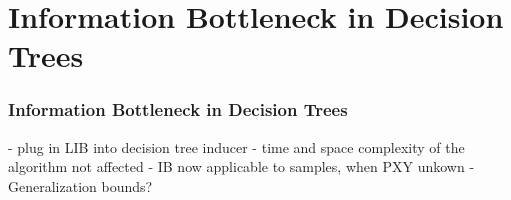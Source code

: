 \section[IB in Trees]{Information Bottleneck in Decision Trees} %

\begin{frame}
\frametitle{Information Bottleneck in Decision Trees}
- plug in LIB into decision tree inducer
- time and space complexity of the algorithm not affected
- IB now applicable to samples, when PXY unkown
- Generalization bounds?

\end{frame}